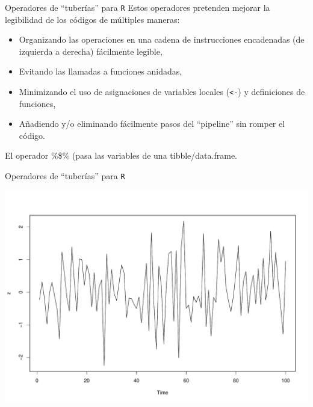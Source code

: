 \documentclass[
  ignorenonframetext,
  aspectratio=169]{beamer}
\newenvironment{Shaded}{\begin{snugshade}}{\end{snugshade}}
\newcommand{\AttributeTok}[1]{\textcolor[rgb]{0.77,0.63,0.00}{#1}}
\newcommand{\DecValTok}[1]{\textcolor[rgb]{0.00,0.00,0.81}{#1}}
\newcommand{\FunctionTok}[1]{\textcolor[rgb]{0.00,0.00,0.00}{#1}}
\newcommand{\NormalTok}[1]{#1}
\newcommand{\SpecialCharTok}[1]{\textcolor[rgb]{0.00,0.00,0.00}{#1}}
\begin{document}
\begin{frame}[fragile]{Operadores de ``tuberías'' para \texttt{R}}
\protect\hypertarget{operadores-de-tuberuxedas-para-r-1}{}
Estos operadores pretenden mejorar la legibilidad de los códigos de
múltiples maneras:

\begin{itemize}
\item
  Organizando las operaciones en una cadena de instrucciones encadenadas
  (de izquierda a derecha) fácilmente legible,
\item
  Evitando las llamadas a funciones anidadas,
\item
  Minimizando el uso de asignaciones de variables locales
  (\texttt{\textless{}-}) y definiciones de funciones,
\item
  Añadiendo y/o eliminando fácilmente pasos del ``pipeline'' sin romper
  el código.
\end{itemize}

El operador \%\$\% (pasa las variables de una tibble/data.frame.

\begin{Shaded}
\end{Shaded}
\end{frame}

\begin{frame}[fragile]{Operadores de ``tuberías'' para \texttt{R}}
\protect\hypertarget{operadores-de-tuberuxedas-para-r-2}{}
\begin{Shaded}
\end{Shaded}

\begin{center}\includegraphics[width=0.5\linewidth]{tidyverse_AD_files/figure-beamer/unnamed-chunk-17-1} \end{center}
\end{frame}
\end{document}
